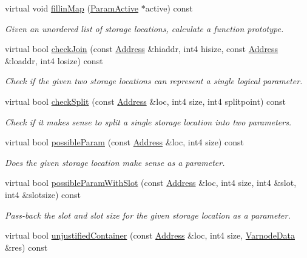 \begin{DoxyCompactItemize}
virtual void \mbox{\hyperlink{class_param_list_standard_a7fa7043f5c6bba995e2ea716ca16ccaf}{fillin\+Map}} (\mbox{\hyperlink{class_param_active}{Param\+Active}} $\ast$active) const
\begin{DoxyCompactList}\small\item\em Given an unordered list of storage locations, calculate a function prototype. \end{DoxyCompactList}\item 
virtual bool \mbox{\hyperlink{class_param_list_standard_ae051857a29a6ed3684c8110fcb53c85c}{check\+Join}} (const \mbox{\hyperlink{class_address}{Address}} \&hiaddr, int4 hisize, const \mbox{\hyperlink{class_address}{Address}} \&loaddr, int4 losize) const
\begin{DoxyCompactList}\small\item\em Check if the given two storage locations can represent a single logical parameter. \end{DoxyCompactList}\item 
virtual bool \mbox{\hyperlink{class_param_list_standard_aec665632071c4504aec5b4c4d153cb62}{check\+Split}} (const \mbox{\hyperlink{class_address}{Address}} \&loc, int4 size, int4 splitpoint) const
\begin{DoxyCompactList}\small\item\em Check if it makes sense to split a single storage location into two parameters. \end{DoxyCompactList}\item 
virtual bool \mbox{\hyperlink{class_param_list_standard_a22a2afd938c503357fac9d330eb89858}{possible\+Param}} (const \mbox{\hyperlink{class_address}{Address}} \&loc, int4 size) const
\begin{DoxyCompactList}\small\item\em Does the given storage location make sense as a parameter. \end{DoxyCompactList}\item 
virtual bool \mbox{\hyperlink{class_param_list_standard_a9b9ed2f66a0e7401208abcd385f2c678}{possible\+Param\+With\+Slot}} (const \mbox{\hyperlink{class_address}{Address}} \&loc, int4 size, int4 \&slot, int4 \&slotsize) const
\begin{DoxyCompactList}\small\item\em Pass-\/back the slot and slot size for the given storage location as a parameter. \end{DoxyCompactList}\item 
virtual bool \mbox{\hyperlink{class_param_list_standard_a10d5f6771892d435ab6711e9df458f60}{unjustified\+Container}} (const \mbox{\hyperlink{class_address}{Address}} \&loc, int4 size, \mbox{\hyperlink{struct_varnode_data}{Varnode\+Data}} \&res) const

\end{DoxyCompactItemize}
